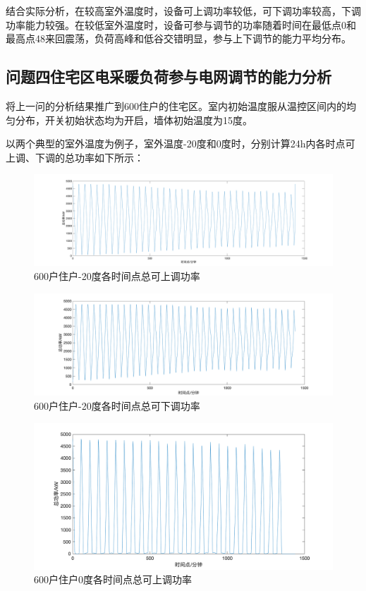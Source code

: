 \documentclass[withoutpreface,bwprint]{cumcmthesis} %
\begin{document}
    结合实际分析，在较高室外温度时，设备可上调功率较低，可下调功率较高，下调功率能力较强。在较低室外温度时，设备可参与调节的功率随着时间在最低点0和最高点48来回震荡，负荷高峰和低谷交错明显，参与上下调节的能力平均分布。
    
    \subsection{问题四\quad 住宅区电采暖负荷参与电网调节的能力分析}
    
   将上一问的分析结果推广到600住户的住宅区。室内初始温度服从温控区间内的均匀分布，开关初始状态均为开启，墙体初始温度为15度。
   
   以两个典型的室外温度为例子，室外温度-20度和0度时，分别计算24h内各时点可上调、下调的总功率如下所示：
\begin{figure}[H]
    \centering
        \includegraphics[width=1\textwidth]{figures/4-up.png}
    \caption{600户住户-20度各时间点总可上调功率}
    \label{fig:my_label}
    \end{figure}
    
    \begin{figure}[H]
    \centering
        \includegraphics[width=1\textwidth]{figures/4-down.png}
    \caption{600户住户-20度各时间点总可下调功率}
    \label{fig:my_label}
    \end{figure}
    \begin{figure}[H]
    \centering
        \includegraphics[width=1\textwidth]{figures/4-0-up.png}
    \caption{600户住户0度各时间点总可上调功率}
    \label{fig:my_label}
    \end{figure}
    
\end{document}
